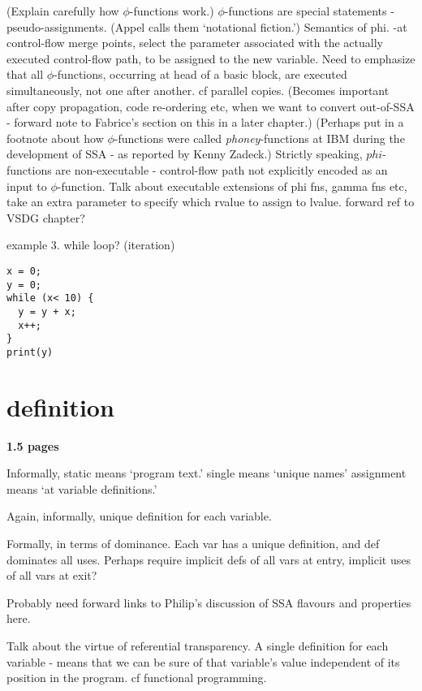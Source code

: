(Explain carefully how $\phi$-functions work.) 
$\phi$-functions are special statements - pseudo-assignments.
(Appel calls them `notational fiction.')
Semantics of phi. -at control-flow merge points,
select the parameter associated with the actually executed
control-flow path, to be assigned to the new variable.
Need to emphasize that all $\phi$-functions, occurring at 
head of a basic block, are executed simultaneously, not one
after another. cf parallel copies. (Becomes important
after copy propagation, code re-ordering etc, when we want
to convert out-of-SSA - forward note to Fabrice's section on this 
in a later chapter.)
(Perhaps put in a footnote about how $\phi$-functions were
called \textit{phoney}-functions at IBM during the development
of SSA - as reported by Kenny Zadeck.)
Strictly speaking, $phi$-functions are non-executable - control-flow
path not explicitly encoded as an input to $\phi$-function.
Talk about executable extensions of phi fns, gamma fns etc,
take an extra parameter to specify which rvalue to assign to
lvalue.
forward ref to VSDG chapter?

example 3. while loop? (iteration)

\begin{verbatim}
x = 0;
y = 0;
while (x< 10) {
  y = y + x;
  x++;
}
print(y)
\end{verbatim}




\section{definition}

\textbf{1.5 pages}

Informally, static means `program text.'
single means `unique names'
assignment means `at variable definitions.'

Again, informally, unique definition for each variable.

Formally, in terms of dominance. Each var has a unique
definition, and def dominates all uses.
Perhaps require implicit defs of all vars at entry,
implicit uses of all vars at exit?

Probably need forward links to Philip's discussion of
SSA flavours and properties here.

Talk about the virtue of referential transparency. A single
definition for each variable - means that we can be sure
of that variable's value independent of its
position in the program. cf functional programming.

